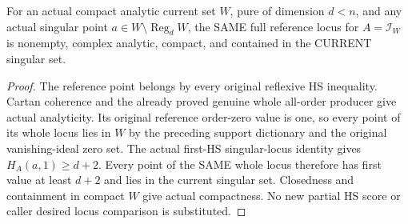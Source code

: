 \begin{theorem}
\label{hir:actual-current-singular-reference-whole-hs-locus}
\leanok
For an actual compact analytic current set $W$, pure of dimension $d<n$,
and any actual singular point $a\in W\setminus\operatorname{Reg}_dW$,
the SAME full reference locus for $A=\mathcal I_W$ is nonempty, complex
analytic, compact, and contained in the CURRENT singular set.
\end{theorem}
\begin{proof}
The reference point belongs by every original reflexive HS inequality.
Cartan coherence and the already proved genuine whole all-order producer
give actual analyticity. Its original reference order-zero value is one,
so every point of its whole locus lies in $W$ by the preceding support
dictionary and the original vanishing-ideal zero set. The actual first-HS
singular-locus identity gives $H_A(a,1)\geq d+2$. Every point of the SAME
whole locus therefore has first value at least $d+2$ and lies in the current
singular set. Closedness and containment in compact $W$ give actual compactness.
No new partial HS score or caller desired locus comparison is substituted.
\end{proof}

